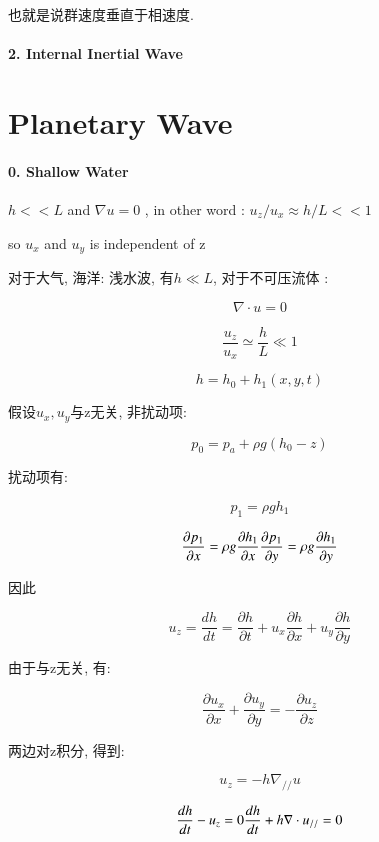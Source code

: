 \documentclass[fontset=windows]{report}
\begin{document}
也就是说群速度垂直于相速度.

\hypertarget{2-internal-inertial-wave}{%
\paragraph{2. Internal Inertial Wave}\label{2-internal-inertial-wave}}


\section{Planetary Wave}

\hypertarget{0-shallow-water}{%
\paragraph{0. Shallow Water}\label{0-shallow-water}}

\(h<<L\) and \(\nabla u = 0\) , in other word :
\(u_z/u_x \approx h/L << 1\)

so \(u_x\) and \(u_y\) is independent of z

对于大气, 海洋: 浅水波, 有\(h \ll L\), 对于不可压流体 :

\[\nabla\cdot u = 0\]

\[\frac{u_z}{u_x}\simeq\frac h L\ll 1\]

\[h=h_0+h_1(x,y,t)\]

假设\(u_x, u_y\)与z无关, 非扰动项:

\[p_0=p_a+\rho g(h_0-z)\]

扰动项有:

\[p_1=\rho gh_1\]

\[\frac {\partial p_1}{\partial x}=\rho g\frac{\partial h_1}{\partial x}\\
\frac {\partial p_1}{\partial y}=\rho g\frac{\partial h_1}{\partial y}\\\]

因此

\[u_z = \frac{dh}{dt}=\frac{\partial h}{\partial t}+u_x\frac {\partial h}{\partial x}+u_y\frac {\partial h}{\partial y}\]

由于与z无关, 有:

\[\frac{\partial u_x}{\partial x}+\frac{\partial u_y}{\partial y}=-\frac{\partial u_z}{\partial z}\]

两边对z积分, 得到:

\[u_z = -h\nabla_{//}u\]

\[\frac {dh}{dt}-u_z=0\\
\frac{dh}{dt}+h\nabla\cdot u_{//}=0\]
\end{document}
